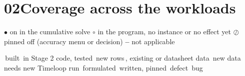 \documentclass[10pt]{article}
\newcommand{\badge}[2]{{\footnotesize\sffamily\colorbox{#1bg}{\textcolor{#1}{\,#2\,}}}}
\renewcommand{\_}{\textunderscore\allowbreak}
\begin{document}
\section*{02\quad Coverage across the workloads}
 

{\small \textbf{$\bullet$} on in the cumulative solve \textbf{$\circ$} in the program, no instance or no effect yet \textbf{$\oslash$} pinned off (accuracy menu or decision) \textbf{--} not applicable}

 

{\small \badge{built}{built} in Stage 2 code, tested \badge{newc}{new rows}, existing or datasheet data \badge{datac}{new data} needs new Timeloop run \badge{pinc}{formulated} written, pinned \badge{badc}{defect} bug}

                                                   
\begingroup\scriptsize
\setlength{\tabcolsep}{3pt}
\renewcommand{\arraystretch}{1.18}
\end{document}
